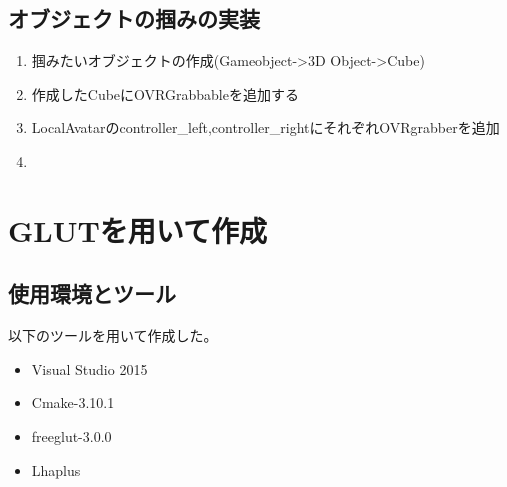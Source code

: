 \documentclass{jsarticle}
\begin{document}
\subsection{オブジェクトの掴みの実装}
\begin{enumerate}
  \item 掴みたいオブジェクトの作成(Gameobject->3D Object->Cube)
  \item 作成したCubeにOVRGrabbableを追加する
  \item LocalAvatarのcontroller\_left,controller\_rightにそれぞれOVRgrabberを追加
  \item

\end{enumerate}



\section{GLUTを用いて作成}
\subsection{使用環境とツール}
以下のツールを用いて作成した。
\begin{itemize}
  \item Visual Studio 2015
  \item Cmake-3.10.1
  \item freeglut-3.0.0
  \item Lhaplus
\end{itemize}
\end{document}
